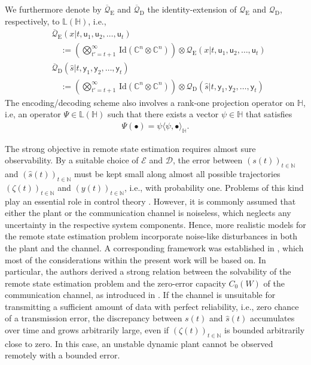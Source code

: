 \documentclass[conference]{IEEEtran}
\newcommand{\ry}{\mathsf{y}}
\newcommand{\ru}{\mathsf{u}}
\def\E{{\mathcal E}}
\def\D{{\mathcal D}}
\def\NN{{\mathbb N}}
\def\CC{{\mathbb C}}
\newcommand{\QE}{\mathcal{Q}_{\mathrm{E}}}
\newcommand{\QD}{\mathcal{Q}_{\mathrm{D}}}
\newcommand{\oQE}{\overline{\mathcal{Q}}_{\mathrm{E}}}
\newcommand{\oQD}{\overline{\mathcal{Q}}_{\mathrm{D}}}
\begin{document}
	We furthermore denote by \(\oQE\) and \(\oQD\) the identity-extension of \(\QE\) and \(\QD\), respectively, to \(\mathbb{L}(\mathbb{H})\), i.e.,
	\begin{align*}	&\oQE(x|t,\ru_1,\ru_2,\ldots,\ru_t) \\
					&\quad:=    \left(\bigotimes_{t'=t+1}^{\infty}\hspace{2pt} \mathrm{Id}(\CC^n\otimes\CC^n)\right) \otimes \QE(x|t,\ru_1,\ru_2,\ldots,\ru_t) \\
					&\oQD(\hat{s}|t,\ry_1,\ry_2,\ldots,\ry_t) \nonumber\\
					&\quad:=    \left(\bigotimes_{t'=t+1}^{\infty}\hspace{2pt} \mathrm{Id}(\CC^n\otimes\CC^n)\right) \otimes \QD(\hat{s}|t,\ry_1,\ry_2,\ldots,\ry_t)
	\end{align*}
	The encoding/decoding scheme also involves a rank-one projection operator on \(\mathbb{H}\), i.e, an operator \(\Psi\in\mathbb{L}(\mathbb{H})\) such that there 
	exists a vector \(\psi\in\mathbb{H}\) that satisfies 
	\begin{align}   \Psi(\bullet) = \psi \langle \psi, \bullet \rangle_{\mathbb{H}}.
	\end{align}

	The strong objective in remote state estimation requires almost sure observability. By a suitable choice of \(\E\) and \(\D\), the error between \((s(t))_{t\in\NN}\)
	and \((\hat{s}(t))_{t\in\NN}\) must be kept small along almost all possible trajectories \((\zeta(t))_{t\in\NN}\) and \((y(t))_{t\in\NN}\), i.e., with probability one. 
	Problems of this kind play an essential role in control theory \cite{BL00, EM01, HOV02, IF02, HT05, HF02, L03, MS04, MS05, MS05a, MS05b, PS01, S06, SP03, TM04, TM04b, WB99}. 
	However, it is commonly assumed that either the plant or the communication channel is noiseless, which neglects any uncertainty in the respective system components. 
	Hence, more realistic models for the remote state estimation problem incorporate noise-like disturbances in both the plant and the channel. 
	A corresponding framework was established in \cite{MS07}, which most of the considerations within the present work will be based on.
	In particular, the authors derived a strong relation between the solvability of the remote state estimation problem and the zero-error capacity \(C_0(W)\) of the 
	communication channel, as introduced in \cite{S56}. If the channel is unsuitable for transmitting a sufficient amount of data with perfect reliability, i.e., zero 
	chance of a transmission error, the discrepancy between \(s(t)\) and \(\hat{s}(t)\) accumulates over time and grows arbitrarily large, even if \((\zeta(t))_{t\in\NN}\) 
	is bounded arbitrarily close to zero. In this case, an unstable dynamic plant cannot be observed remotely with a bounded error. 
\end{document}
